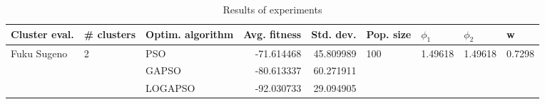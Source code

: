 \begin{table}
\centering
\caption{Results of experiments}
\begin{tabular}{lllrrllll}
\toprule
               Cluster eval. &        \# clusters & Optim. algorithm &  Avg. fitness &  Std. dev. &            Pop. size &               $\phi_{1}$ &               $\phi_{2}$ &                       w \\
\midrule
\multirow{3}{*}{Fuku Sugeno} & \multirow{3}{*}{2} &              PSO &    -71.614468 &  45.809989 & \multirow{3}{*}{100} & \multirow{3}{*}{1.49618} & \multirow{3}{*}{1.49618} & \multirow{3}{*}{0.7298} \\
                             &                    &            GAPSO &    -80.613337 &  60.271911 &                      &                          &                          &                         \\
                             &                    &          LOGAPSO &    -92.030733 &  29.094905 &                      &                          &                          &                         \\
\bottomrule
\end{tabular}
\end{table}

